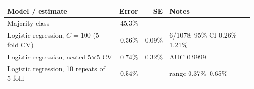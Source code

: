 \begin{tabular}{lrrl}
\toprule
Model / estimate & Error & SE & Notes \\
\midrule
Majority class & 45.3\% & -- & -- \\
Logistic regression, $C=100$ (5-fold CV) & 0.56\% & 0.09\% & 6/1078; 95\% CI 0.26\%--1.21\% \\
Logistic regression, nested 5$\times$5 CV & 0.74\% & 0.32\% & AUC 0.9999 \\
Logistic regression, 10 repeats of 5-fold & 0.54\% & -- & range 0.37\%--0.65\% \\
\bottomrule
\end{tabular}
